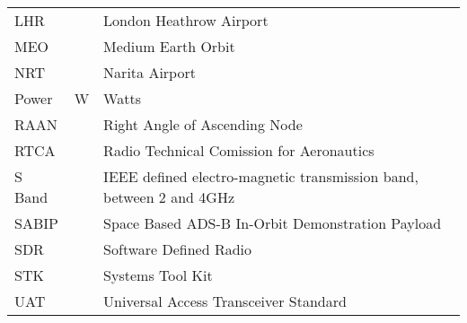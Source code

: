 \begin{longtable}[l]{p{50pt} p{60pt} p{300pt}}
    LHR   &       & London Heathrow Airport \\
    MEO   &       & Medium Earth Orbit \\
    NRT   &       & Narita Airport \\
    Power & W     & Watts \\
    RAAN  &       & Right Angle of Ascending Node \\
    RTCA  &       & Radio Technical Comission for Aeronautics \\
    S Band &       & IEEE defined electro-magnetic transmission band, between 2 and 4GHz \\
    SABIP &       & Space Based ADS-B In-Orbit Demonstration Payload \\
    SDR   &       & Software Defined Radio \\
    STK   &       & Systems Tool Kit \\
    UAT   &       & Universal Access Transceiver Standard \\
 
\end{longtable}
\renewcommand*{\arraystretch}{1.4}

